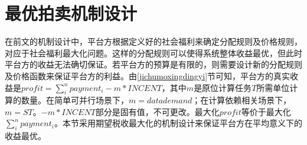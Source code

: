 \documentclass[promaster]{thesis-uestc}
\begin{document}
%

%




%





\section{最优拍卖机制设计}

在前文的机制设计中，平台方根据定义好的社会福利来确定分配规则及价格规则，对应于社会福利最大化问题。这样的分配规则可以使得系统整体收益最优，但此时平台方的收益无法确切保证。若平台方的预算是有限的，则需要设计新的分配规则及价格函数来保证平台方的利益。由\ref{jichumoxingdingyi}节可知，平台方的真实收益是$profit = \sum_{i}^{n}{payment_i}-m*INCENT$，其中$m$是原位计算任务$T$所需单位计算的数量。在简单可并行场景下，$m=datademand$；在计算依赖相关场景下，$m=ST$。$-m*INCENT$部分是固有值，不可更改。最大化$profit$等价于最大化$\sum_{i}^{n}{payment_i}$。本节采用期望税收最大化的机制设计来保证平台方在平均意义下的收益最优。
\end{document}
